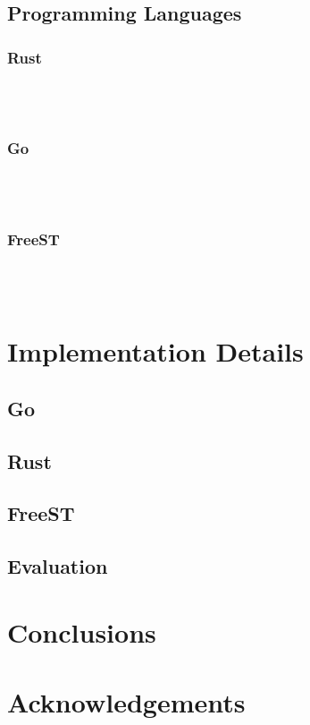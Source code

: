 \documentclass[runningheads]{llncs}
\begin{document}
\subsection{Programming Languages}
\subsubsection{Rust}\hfill\\\\
\subsubsection{Go}\hfill\\\\
\subsubsection{FreeST}\hfill\\\\
\lipsum[1]
\section{Implementation Details}
\lipsum[1]
\subsection{Go}
\lipsum[1]
\subsection{Rust}
\lipsum[1]
\subsection{FreeST}
\lipsum[1]
\subsection{Evaluation}
\lipsum[1]
\section{Conclusions}
\lipsum
\section*{Acknowledgements}
\lipsum[1]


\end{document}
